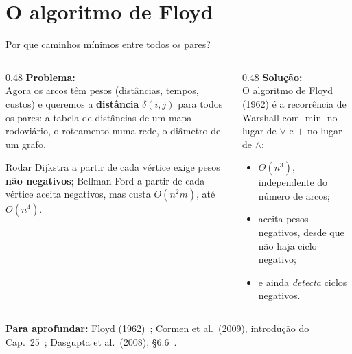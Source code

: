 \documentclass[aspectratio=169,xcolor=table]{beamer}
\newcommand{\fonte}[1]{%
  \vfill
  {\tiny\color{gray!55!black}\textbf{Para aprofundar:} #1\par}%
}
\begin{document}
\section{O algoritmo de Floyd}

\begin{frame}{Por que caminhos mínimos entre todos os pares?}
  \begin{columns}[T]
    \begin{column}{0.48\textwidth}
      \textbf{Problema:}\\[2pt]
      \scriptsize Agora os arcos têm pesos (distâncias, tempos, custos) e queremos a
      \textbf{distância} $\delta(i,j)$ para todos os pares: a tabela de distâncias de um mapa
      rodoviário, o roteamento numa rede, o diâmetro de um grafo.
      \medskip

      Rodar Dijkstra a partir de cada vértice exige pesos \textbf{não negativos}; Bellman-Ford
      a partir de cada vértice aceita negativos, mas custa $O(n^2 m)$, até $O(n^4)$.
    \end{column}
    \begin{column}{0.48\textwidth}
      \textbf{Solução:}\\[2pt]
      \scriptsize O algoritmo de Floyd (1962) é a recorrência de Warshall com $\min$ no lugar
      de $\lor$ e $+$ no lugar de $\land$:
      \begin{itemize}\scriptsize
        \item $\Theta(n^3)$, independente do número de arcos;
        \item aceita pesos negativos, desde que não haja ciclo negativo;
        \item e ainda \emph{detecta} ciclos negativos.
      \end{itemize}
    \end{column}
  \end{columns}
  \fonte{Floyd (1962)~\cite{floyd1962algorithm}; Cormen et al.\ (2009), introdução do
    Cap.\ 25~\cite{cormen2009introduction}; Dasgupta et al.\ (2008),
    \S 6.6~\cite{dasgupta2008algorithms}.}
\end{frame}
\end{document}
